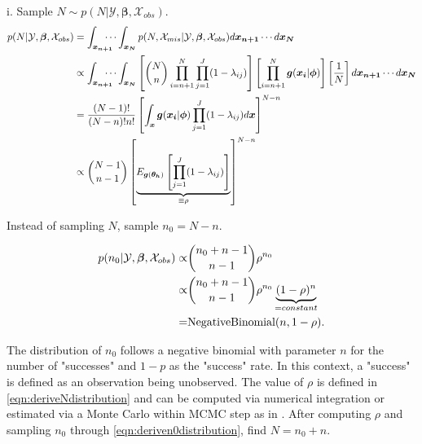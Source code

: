 \documentclass[
  12pt,
]{article}
\begin{document}
\begin{list}{}{}
\begin{list}{}{}
  \item[i.] Sample $N \sim  p(N|\mathcal{Y},\boldsymbol{\beta},\mathcal{X}_{obs})$. 
    \begin{align}
    \label{eqn:deriveNdistribution}
    \nonumber p(N|\mathcal{Y},\boldsymbol{\beta},\mathcal{X}_{obs}) & = \int_{\boldsymbol{x_{n+1}}} \hspace{-10px}\cdots    \int_{\boldsymbol{x_{N}}} p(N,\mathcal{X}_{mis}|\mathcal{Y},\boldsymbol{\beta},\mathcal{X}_{obs}) d\boldsymbol{x_{n+1}}\cdots d\boldsymbol{x_{N}}\\
\nonumber    & \propto \int_{\boldsymbol{x_{n+1}}} \hspace{-10px}\cdots \int_{\boldsymbol{x_{N}}}\left[\binom{N}{n} \prod_{i=n+1}^N \prod_{j=1}^J (1-\lambda_{ij}) \right]\left[ \prod_{i=n+1}^N\boldsymbol{g}(\boldsymbol{x_i}|\boldsymbol{\phi}) \right]\left[\frac{1}{N}\right]d\boldsymbol{x_{n+1}}\cdots d\boldsymbol{x_{N}}\\
\nonumber    & = \frac{(N-1)!}{(N-n)!n!} \left[ \int_{\boldsymbol{x}}\boldsymbol{g}(\boldsymbol{x_i}|\boldsymbol{\phi})\prod_{j=1}^J (1-\lambda_{ij}) d\boldsymbol{x}\right]^{N-n}\\
    & \propto \binom{N-1}{n-1} \left[\underbrace{ E_{\boldsymbol{g}(\boldsymbol{\theta_h})}\left[\prod_{j=1}^J (1-\lambda_{ij})\right]}_{\equiv \rho} \right]^{N-n}
    \end{align}
    
Instead of sampling $N$, sample $n_0 = N - n$.
    
    \vspace{-20px}
    
    \begin{align}
    \label{eqn:deriven0distribution}
\nonumber    p(n_0|\mathcal{Y},\boldsymbol{\beta},\mathcal{X}_{obs}) \propto & \binom{n_0 + n -1}{n-1}\rho^{n_0} \\
\nonumber \propto & \binom{n_0 + n -1}{n-1} \rho^{n_0} \underbrace{(1-\rho)^{n}}_{\text =constant}\\
=& \text{NegativeBinomial}(n, 1-\rho).
    \end{align}
    
The distribution of $n_0$ follows a negative binomial with parameter $n$ for the number of "successes" and $1-p$ as the "success" rate.  In this context, a "success" is defined as an observation being unobserved.  The value of $\rho$ is defined in \autoref{eqn:deriveNdistribution} and can be computed via numerical integration or estimated via a Monte Carlo within MCMC step as in \cite{bonner_mcmcmc_2014}.  After computing $\rho$ and sampling $n_0$ through \autoref{eqn:deriven0distribution}, find $N = n_0 + n$.
    

\end{list}
\end{list}
\end{document}
